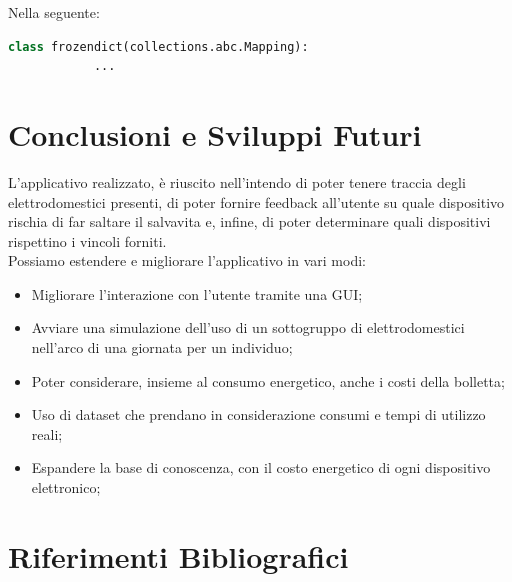 \documentclass[12pt, letterpaper]{article}
\begin{document}
Nella seguente:

\begin{lstlisting}[language=Python]
      class frozendict(collections.abc.Mapping):
            ...
\end{lstlisting}

\section{Conclusioni e Sviluppi Futuri}

L'applicativo realizzato, è riuscito nell'intendo di poter tenere traccia degli elettrodomestici
presenti, di poter fornire feedback all'utente su quale dispositivo rischia di far saltare il salvavita
e, infine, di poter determinare quali dispositivi rispettino i vincoli forniti. \\

\noindent Possiamo estendere e migliorare l'applicativo in vari modi:
\begin{itemize}
      \item Migliorare l'interazione con l'utente tramite una GUI;
      \item Avviare una simulazione dell'uso di un sottogruppo di elettrodomestici
            nell'arco di una giornata per un individuo;
      \item Poter considerare, insieme al consumo energetico, anche i costi della bolletta;
      \item Uso di dataset che prendano in considerazione consumi e tempi di utilizzo reali;
      \item Espandere la base di conoscenza, con il costo energetico di ogni dispositivo elettronico;
\end{itemize}

\section{Riferimenti Bibliografici}
\end{document}
